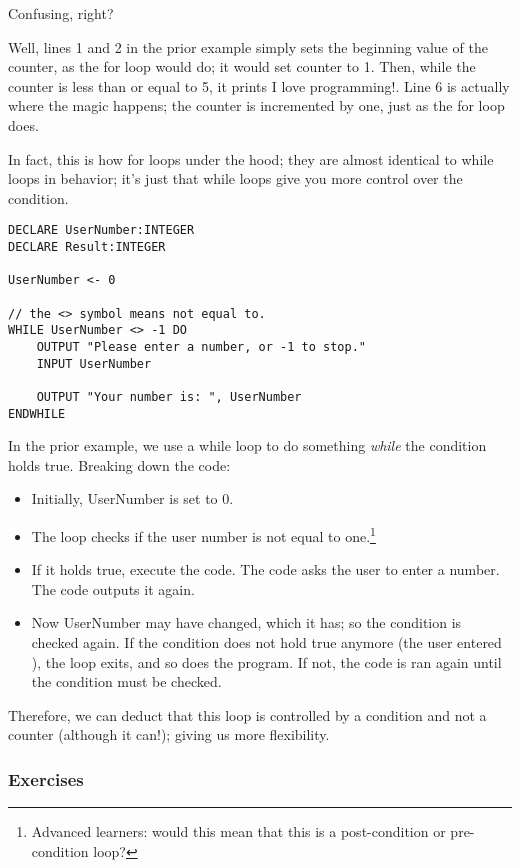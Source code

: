 \documentclass[./main.tex]{subfiles}
\begin{document}
Confusing, right?

Well, lines 1 and 2 in the prior example simply sets the beginning value of the counter, as the for loop would do; it would set counter to 1. Then, while the counter is less than or equal to 5, it prints {\ccmono I love programming!}. Line 6 is actually where the magic happens; the counter is incremented by one, just as the for loop does.

In fact, this is how for loops under the hood; they are almost identical to while loops in behavior; it's just that while loops give you more control over the condition.

\begin{verbatim}
DECLARE UserNumber:INTEGER
DECLARE Result:INTEGER

UserNumber <- 0

// the <> symbol means not equal to.
WHILE UserNumber <> -1 DO 
    OUTPUT "Please enter a number, or -1 to stop."
    INPUT UserNumber

    OUTPUT "Your number is: ", UserNumber
ENDWHILE
\end{verbatim}

In the prior example, we use a while loop to do something \emph{while} the condition holds true. Breaking down the code:

\begin{itemize}
    \item Initially, {\ccmono UserNumber} is set to 0.
    \item The loop checks if the user number is not equal to one.\footnote{Advanced learners: would this mean that this is a post-condition or pre-condition loop?}
    \item If it holds true, execute the code. The code asks the user to enter a number. The code outputs it again.
    \item Now {\ccmono UserNumber} may have changed, which it has; so the condition is checked again. If the condition does not hold true anymore (the user entered {}), the loop exits, and so does the program. If not, the code is ran again until the condition must be checked.
\end{itemize}

Therefore, we can deduct that this loop is controlled by a condition and not a counter (although it can!); giving us more flexibility.

\subsubsection{Exercises}
\end{document}
